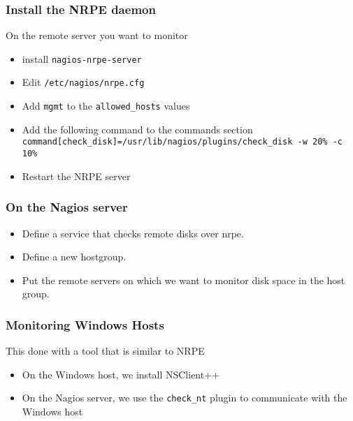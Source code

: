 \documentclass[10pt]{beamer}
\begin{document}
\begin{frame}
  \frametitle{Install the NRPE daemon}

On the remote server you want to monitor
\begin{itemize}
	\item install \texttt{nagios-nrpe-server}
  \item Edit \texttt{/etc/nagios/nrpe.cfg}
  \item Add \texttt{mgmt} to the \texttt{allowed\_hosts} values
  \item Add the following command to the commands section \\
   \texttt{command[check\_disk]=/usr/lib/nagios/plugins/check\_disk -w 20\% -c 10\%}

  \item Restart the NRPE server
\end{itemize}
\end{frame}

\begin{frame}
  \frametitle{On the Nagios server}

  \begin{itemize}
	  \item Define a service that checks remote disks over nrpe.
	  \item Define a new hostgroup.
	  \item Put the remote servers on which we want to monitor disk
		  space in the host group.
  \end{itemize}
\end{frame}
\begin{frame}
  \frametitle{Monitoring Windows Hosts}

This done with a tool that is similar to NRPE
\begin{itemize}
  \item On the Windows host, we install NSClient++
  \item On the Nagios server, we use the \texttt{check\_nt} plugin to communicate with
        the Windows host
\end{itemize}
\end{frame}
\end{document}
